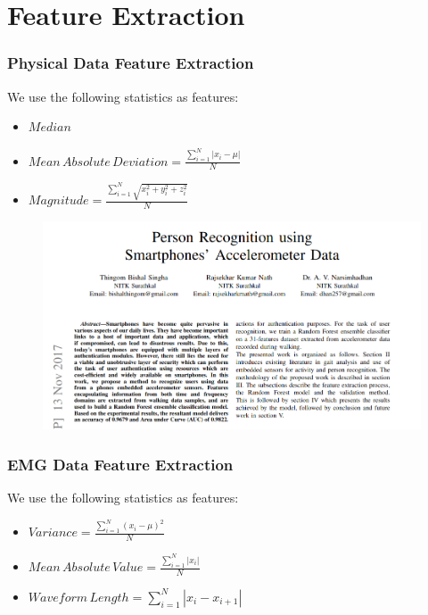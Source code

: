\documentclass{beamer}
\begin{document}
\section{Feature Extraction}
\begin{frame}
\frametitle{Physical Data Feature Extraction}
We use the following statistics as features:
\begin{itemize}
\item $Median$
\item $Mean\, Absolute\, Deviation = \frac{\sum_{i = 1}^{N} |x_i - \mu|}{N}$
\item $Magnitude = \frac{\sum_{i = 1}^{N}\sqrt{x_i^2 + y_i^2 + z_i^2}}{N}$
\end{itemize}
\end{frame}
\begin{frame}

\begin{figure}
	\includegraphics[scale=.35]{phys_fe}
\end{figure}

\end{frame}

\begin{frame}
\frametitle{EMG Data Feature Extraction}
We use the following statistics as features:
\begin{itemize}
\item $Variance = \frac{\sum_{i = 1}^{N}(x_i - \mu)^2}{N}$
\item $Mean\, Absolute\, Value = \frac{\sum_{i = 1}^{N} |x_i|}{N}$
\item $Waveform\,Length = \sum_{i = 1}^{N}|x_i - x_{i + 1}|$
\end{itemize}
\end{frame}
\end{document}
